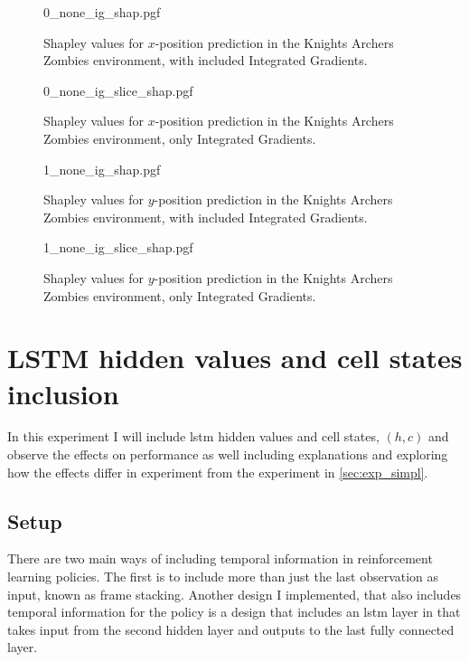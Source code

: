 \documentclass[UKenglish]{uiomasterthesis}
\begin{document}
\begin{figure}[H]
\centering
{0_none_ig_shap.pgf}
\caption{Shapley values for $x$-position prediction in the Knights Archers Zombies environment, with included Integrated Gradients.}
\label{fig:state_archer_ig_shap_0}
\end{figure}

\begin{figure}[H]
\centering
{0_none_ig_slice_shap.pgf}
\caption{Shapley values for $x$-position prediction in the Knights Archers Zombies environment, only Integrated Gradients.}
\label{fig:state_archer_ig_slice_0}
\end{figure}

\begin{figure}[H]
\centering
{1_none_ig_shap.pgf}
\caption{Shapley values for $y$-position prediction in the Knights Archers Zombies environment, with included Integrated Gradients.}
\label{fig:state_archer_ig_shap_1}
\end{figure}

\begin{figure}[H]
\centering
{1_none_ig_slice_shap.pgf}
\caption{Shapley values for $y$-position prediction in the Knights Archers Zombies environment, only Integrated Gradients.}
\label{fig:state_archer_ig_slice_shap_1}
\end{figure}


\section{LSTM hidden values and cell states inclusion}
\label{sec:exp_lstm}
In this experiment I will include \ac{lstm} hidden values and cell states, $(h,c)$ and observe the effects on performance as well including explanations and exploring how the effects differ in experiment from the experiment in \cref{sec:exp_simpl}.

\subsection{Setup}
There are two main ways of including temporal information in reinforcement learning policies. The first is to include more than just the last observation as input, known as frame stacking. Another design I implemented, that also includes temporal information for the policy is a design that includes an \ac{lstm} layer in that takes input from the second hidden layer and outputs to the last fully connected layer.
\end{document}
